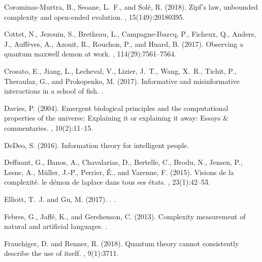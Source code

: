 \documentclass[graybox]{svmult}
\begin{document}
\begin{thebibliography}{}
Corominas-Murtra, B., Seoane, L.~F., and Sol{\'e}, R. (2018).
\newblock Zipf’s law, unbounded complexity and open-ended evolution.
, 15(149):20180395.

Cottet, N., Jezouin, S., Bretheau, L., Campagne-Ibarcq, P., Ficheux, Q.,
  Anders, J., Auff{\`e}ves, A., Azouit, R., Rouchon, P., and Huard, B. (2017).
\newblock Observing a quantum maxwell demon at work.
,
  114(29):7561--7564.

Crosato, E., Jiang, L., Lecheval, V., Lizier, J.~T., Wang, X.~R., Tichit, P.,
  Theraulaz, G., and Prokopenko, M. (2017).
\newblock Informative and misinformative interactions in a school of fish.
.

Davies, P. (2004).
\newblock Emergent biological principles and the computational properties of
  the universe: Explaining it or explaining it away: Essays \& commentaries.
, 10(2):11--15.

DeDeo, S. (2016).
\newblock Information theory for intelligent people.

Deffuant, G., Banos, A., Chavalarias, D., Bertelle, C., Brodu, N., Jensen, P.,
  Lesne, A., M{\"u}ller, J.-P., Perrier, {\'E}., and Varenne, F. (2015).
\newblock Visions de la complexit{\'e}. le d{\'e}mon de laplace dans tous ses
  {\'e}tats.
, 23(1):42--53.

{Elliott}, T.~J. and {Gu}, M. (2017).
.
.

Febres, G., Jaff{\'e}, K., and Gershenson, C. (2013).
\newblock Complexity measurement of natural and artificial languages.
.

Frauchiger, D. and Renner, R. (2018).
\newblock Quantum theory cannot consistently describe the use of itself.
, 9(1):3711.


\end{thebibliography}
\end{document}
